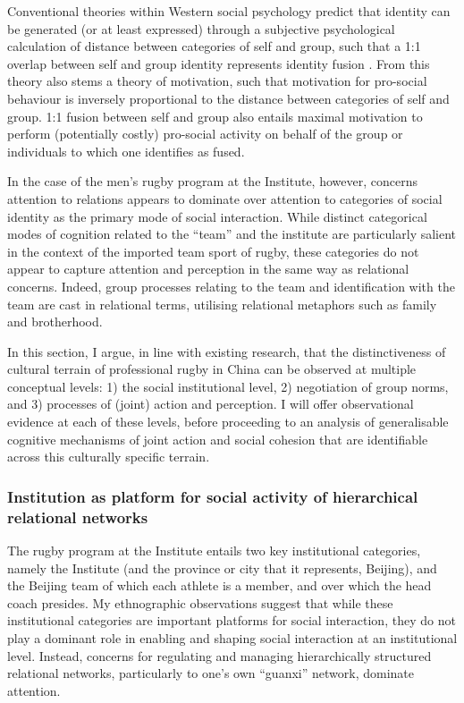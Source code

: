 \begin{CJK}{UTF8}{gbsn}
  Conventional theories within Western social psychology predict that identity can be generated (or at least expressed) through a subjective psychological calculation of distance between categories of self and group, such that a 1:1 overlap between self and group identity represents identity fusion \citep{Swann2009}.  From this theory also stems a theory of motivation, such that motivation for pro-social behaviour is inversely proportional to the distance between categories of self and group. 1:1 fusion between self and group also entails maximal motivation to perform (potentially costly) pro-social activity on behalf of the group or individuals to which one identifies as fused.

  In the case of the men's rugby program at the Institute, however, concerns attention to relations appears to dominate over attention to categories of social identity as the primary mode of social interaction.  While distinct categorical modes of cognition related to the ``team'' and the institute are particularly salient in the context of the imported team sport of rugby, these categories do not appear to capture attention and perception in the same way as relational concerns.  Indeed, group processes relating to the team and identification with the team are cast in relational terms, utilising relational metaphors such as family and brotherhood.

  In this section, I argue, in line with existing research, that the distinctiveness of cultural terrain of professional rugby in China can be observed at multiple conceptual levels: 1) the social institutional level, 2) negotiation of group norms, and 3) processes of (joint) action and perception.  I will offer observational evidence at each of these levels, before proceeding to an analysis of generalisable cognitive mechanisms of joint action and social cohesion that are identifiable across this culturally specific terrain.

  \subsubsection{Institution as platform for social activity of hierarchical relational networks}

  The rugby program at the Institute entails two key institutional categories, namely the Institute (and the province or city that it represents, Beijing), and the Beijing team of which each athlete is a member, and over which the head coach presides.  My ethnographic observations suggest that while these institutional categories are important platforms for social interaction, they do not play a dominant role in enabling and shaping social interaction at an institutional level.  Instead, concerns for regulating and managing hierarchically structured relational networks, particularly to one's own ``guanxi'' network, dominate attention.


\end{CJK}
